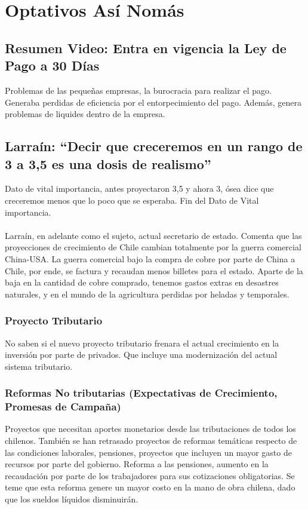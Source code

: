 \newpage

\section{Optativos Así Nomás}

\subsection{Resumen Video: Entra en vigencia la Ley de Pago a 30 Días}
Problemas de las pequeñas empresas, la burocracia para realizar el pago. Generaba perdidas de eficiencia por el entorpecimiento del pago. Además, genera problemas de liquides dentro de la empresa.
\subsection{Larraín: “Decir que creceremos en un rango de 3 a 3,5 es una dosis de realismo”}
Dato de vital importancia, antes proyectaron 3,5 y ahora 3, ósea dice que creceremos menos que lo poco que se esperaba. Fin del Dato de Vital importancia. 
\\
\\
Larraín, en adelante como el sujeto, actual secretario de estado. Comenta que las proyecciones de crecimiento de Chile cambian totalmente por la guerra comercial China-USA. La guerra comercial bajo la compra de cobre por parte de China a Chile, por ende, se factura y recaudan menos billetes para el estado. Aparte de la baja en la cantidad de cobre comprado, tenemos gastos extras en desastres naturales, y en el mundo de la agricultura perdidas por heladas y temporales. 
\subsubsection{Proyecto Tributario}
No saben si el nuevo proyecto tributario frenara el actual crecimiento en la inversión por parte de privados. Que incluye una modernización del actual sistema tributario. 
\subsubsection{Reformas No tributarias (Expectativas de Crecimiento, Promesas de Campaña)}
Proyectos que necesitan aportes monetarios desde las tributaciones de todos los chilenos. También se han retrasado proyectos de reformas temáticas respecto de las condiciones laborales, pensiones, proyectos que incluyen un mayor gasto de recursos por parte del gobierno. 	
Reforma a las pensiones, aumento en la recaudación por parte de los trabajadores para sus cotizaciones obligatorias. Se teme que esta reforma genere un mayor costo en la mano de obra chilena, dado que los sueldos líquidos disminuirán. 
